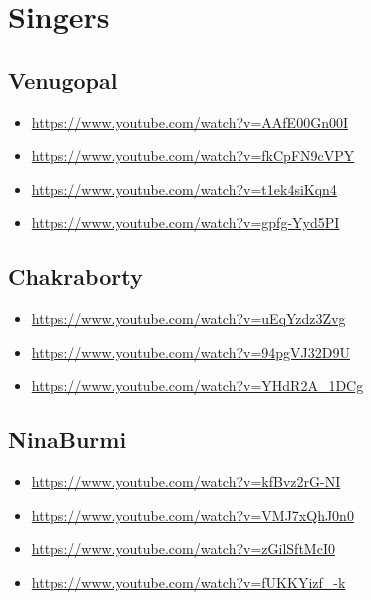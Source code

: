 \section{Singers}
\label{sec:org0340d4a}

\subsection{Venugopal}
\label{sec:org64e174f}
\begin{itemize}
\item \url{https://www.youtube.com/watch?v=AAfE00Gn00I}
\item \url{https://www.youtube.com/watch?v=fkCpFN9cVPY}
\item \url{https://www.youtube.com/watch?v=t1ek4siKqn4}
\item \url{https://www.youtube.com/watch?v=gpfg-Yyd5PI}
\end{itemize}

\subsection{Chakraborty}
\label{sec:org6a4f2b6}
\begin{itemize}
\item \url{https://www.youtube.com/watch?v=uEqYzdz3Zvg}
\item \url{https://www.youtube.com/watch?v=94pgVJ32D9U}
\item \url{https://www.youtube.com/watch?v=YHdR2A\_1DCg}
\end{itemize}

\subsection{NinaBurmi}
\label{sec:org4dfb1a9}
\begin{itemize}
\item \url{https://www.youtube.com/watch?v=kfBvz2rG-NI}
\item \url{https://www.youtube.com/watch?v=VMJ7xQhJ0n0}
\item \url{https://www.youtube.com/watch?v=zGilSftMcI0}
\item \url{https://www.youtube.com/watch?v=fUKKYizf\_-k}
\end{itemize}

